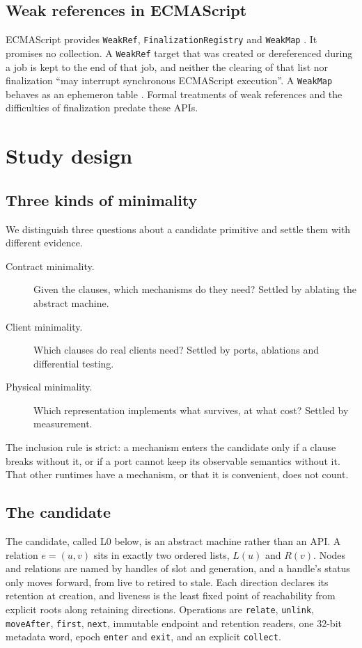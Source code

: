 \documentclass[11pt]{article}
\begin{document}
\subsection{Weak references in ECMAScript}

ECMAScript provides \texttt{WeakRef}, \texttt{FinalizationRegistry} and \texttt{WeakMap} \cite{ecma262}. It promises no collection. A \texttt{WeakRef} target that was created or dereferenced during a job is kept to the end of that job, and neither the clearing of that list nor finalization ``may interrupt synchronous ECMAScript execution''. A \texttt{WeakMap} behaves as an ephemeron table \cite{hayes1997}. Formal treatments of weak references \cite{donnelly2006} and the difficulties of finalization \cite{boehm2003} predate these APIs.

\section{Study design}
\label{sec:design}

\subsection{Three kinds of minimality}

We distinguish three questions about a candidate primitive and settle them with different evidence.

\begin{description}
\item[Contract minimality.] Given the clauses, which mechanisms do they need? Settled by ablating the abstract machine.
\item[Client minimality.] Which clauses do real clients need? Settled by ports, ablations and differential testing.
\item[Physical minimality.] Which representation implements what survives, at what cost? Settled by measurement.
\end{description}

The inclusion rule is strict: a mechanism enters the candidate only if a clause breaks without it, or if a port cannot keep its observable semantics without it. That other runtimes have a mechanism, or that it is convenient, does not count.

\subsection{The candidate}

The candidate, called L0 below, is an abstract machine rather than an API. A relation $e=(u,v)$ sits in exactly two ordered lists, $L(u)$ and $R(v)$. Nodes and relations are named by handles of slot and generation, and a handle's status only moves forward, from live to retired to stale. Each direction declares its retention at creation, and liveness is the least fixed point of reachability from explicit roots along retaining directions. Operations are \texttt{relate}, \texttt{unlink}, \texttt{moveAfter}, \texttt{first}, \texttt{next}, immutable endpoint and retention readers, one 32-bit metadata word, epoch \texttt{enter} and \texttt{exit}, and an explicit \texttt{collect}.
\end{document}
